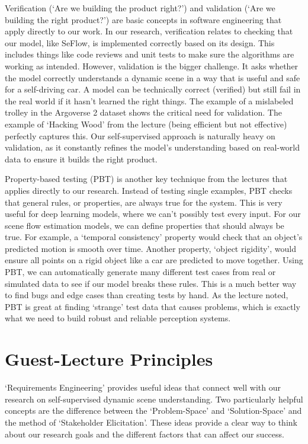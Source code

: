 \documentclass{article}
\begin{document}
Verification (`Are we building the product right?') and validation (`Are we building the right product?') are basic concepts in software engineering that apply directly to our work. In our research, verification relates to checking that our model, like SeFlow, is implemented correctly based on its design. This includes things like code reviews and unit tests to make sure the algorithms are working as intended. However, validation is the bigger challenge. It asks whether the model correctly understands a dynamic scene in a way that is useful and safe for a self-driving car. 
A model can be technically correct (verified) but still fail in the real world if it hasn't learned the right things. The example of a mislabeled trolley in the Argoverse 2 dataset shows the critical need for validation. 
The example of `Hacking Wood' from the lecture (being efficient but not effective) perfectly captures this. 
Our self-supervised approach is naturally heavy on validation, as it constantly refines the model's understanding based on real-world data to ensure it builds the right product.

Property-based testing (PBT) is another key technique from the lectures that applies directly to our research. Instead of testing single examples, PBT checks that general rules, or properties, are always true for the system. 
This is very useful for deep learning models, where we can't possibly test every input. For our scene flow estimation models, we can define properties that should always be true. 
For example, a `temporal consistency' property would check that an object's predicted motion is smooth over time.
Another property, `object rigidity', would ensure all points on a rigid object like a car are predicted to move together. Using PBT, we can automatically generate many different test cases from real or simulated data to see if our model breaks these rules. This is a much better way to find bugs and edge cases than creating tests by hand. 
As the lecture noted, PBT is great at finding `strange' test data that causes problems, which is exactly what we need to build robust and reliable perception systems.

\section{Guest-Lecture Principles}
`Requirements Engineering' provides useful ideas that connect well with our research on self-supervised dynamic scene understanding. 
Two particularly helpful concepts are the difference between the `Problem-Space' and `Solution-Space' and the method of `Stakeholder Elicitation'. 
These ideas provide a clear way to think about our research goals and the different factors that can affect our success.
\end{document}
